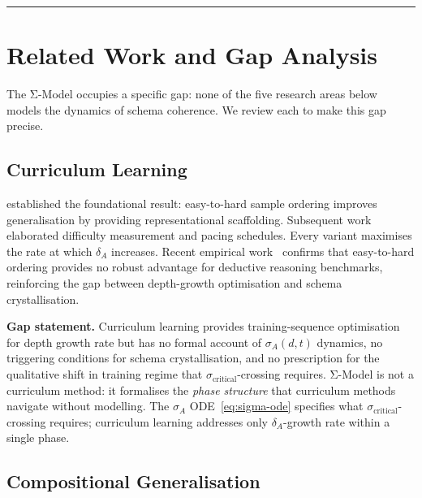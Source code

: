 \documentclass[10pt]{article}
\begin{document}
\noindent\rule{\linewidth}{0.4pt}

\section{Related Work and Gap Analysis}\label{sec:related-work}

The Σ-Model occupies a specific gap: none of the five research areas below models the dynamics of schema coherence. We review each to make this gap precise.

\subsection{Curriculum Learning}\label{sec:curriculum-learning}

\cite{bengio2009curriculumlearning} established the foundational result:
easy-to-hard sample ordering improves generalisation by providing
representational scaffolding. Subsequent work elaborated difficulty
measurement \citep{kumar2010selfpacedlearning,portelas2020automaticcurriculumlearningdeep,
narvekar2020curriculumlearningreinforcementlearning} and pacing schedules.
Every variant maximises the rate at which $\delta_A$ increases.
Recent empirical work~\cite{mordig2026rethinkingeasytohard} confirms
that easy-to-hard ordering provides no robust advantage for
deductive reasoning benchmarks, reinforcing the gap between
depth-growth optimisation and schema crystallisation.

\textbf{Gap statement.} Curriculum learning provides training-sequence
optimisation for depth growth rate but has no formal account of
$\sigma_A(d,t)$ dynamics, no triggering conditions for schema
crystallisation, and no prescription for the qualitative shift in
training regime that $\sigma_{\text{critical}}$-crossing requires. Σ-Model
is not a curriculum method: it formalises the \emph{phase structure} that
curriculum methods navigate without modelling. The
$\sigma_A$ ODE~\eqref{eq:sigma-ode} specifies what
$\sigma_{\text{critical}}$-crossing requires; curriculum learning
addresses only $\delta_A$-growth rate within a single phase.

\subsection{Compositional Generalisation}\label{sec:compositional-generalisation}
\end{document}
